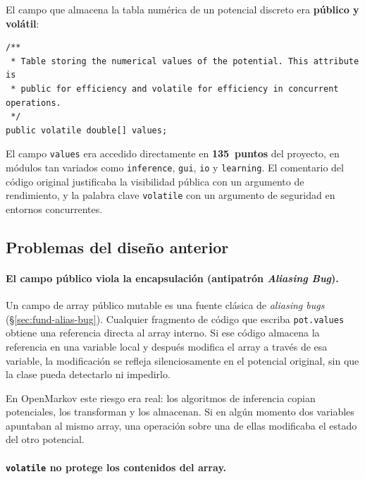 \documentclass[11pt,a4paper]{article}
\newcommand{\code}[1]{\texttt{#1}}
\begin{document}
El campo que almacena la tabla numérica de un potencial discreto era
\textbf{público y volátil}:

\begin{lstlisting}[caption={Campo \texttt{values} antes de la encapsulación.},
                   label=lst:values-antes]
/**
 * Table storing the numerical values of the potential. This attribute is
 * public for efficiency and volatile for efficiency in concurrent operations.
 */
public volatile double[] values;
\end{lstlisting}

El campo \code{values} era accedido directamente en \textbf{135~puntos}
del proyecto, en módulos tan variados como \code{inference},
\code{gui}, \code{io} y \code{learning}.  El comentario del código
original justificaba la visibilidad pública con un argumento de
rendimiento, y la palabra clave \code{volatile} con un argumento de
seguridad en entornos concurrentes.

\subsection{Problemas del diseño anterior}

\paragraph{El campo público viola la encapsulación (antipatrón
\emph{Aliasing Bug}).}

Un campo de array público mutable es una fuente clásica de
\emph{aliasing bugs} (§\ref{sec:fund-alias-bug}).  Cualquier fragmento
de código que escriba \code{pot.values} obtiene una referencia
directa al array interno.  Si ese código almacena la referencia en
una variable local y después modifica el array a través de esa
variable, la modificación se refleja silenciosamente en el potencial
original, sin que la clase pueda detectarlo ni impedirlo.

En OpenMarkov este riesgo era real: los algoritmos de inferencia copian
potenciales, los transforman y los almacenan.  Si en algún momento
dos variables apuntaban al mismo array, una operación sobre una de
ellas modificaba el estado del otro potencial.

\paragraph{\code{volatile} no protege los contenidos del array.}
\end{document}

